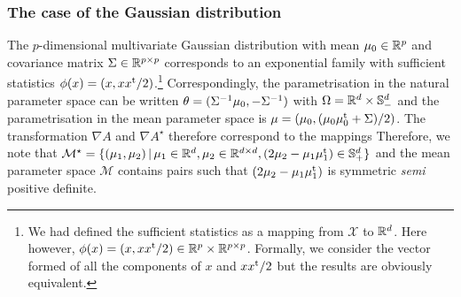 \subsubsection*{The case of the Gaussian distribution}
The $p$-dimensional multivariate Gaussian distribution with mean $\mu_0\in\mathbb R^{p}$ and covariance matrix $\Sigma\in\mathbb R^{p\times p}$ corresponds to an exponential family with sufficient statistics $\phi(x) = (x,xx^\mathrm{t}/2)$.\footnote{We had defined the sufficient statistics as a mapping from $\mathcal X$ to $\mathbb R^{d}$. Here however, $\phi(x)=(x,xx^\mathrm{t}/2)\in\mathbb R^{p}\times \mathbb R^{p\times p}$. Formally, we consider the vector formed of all the components of $x$ and $xx^\mathrm{t}/2$ but the results are obviously equivalent.} Correspondingly, the parametrisation in the natural parameter space can be written $\theta=(\Sigma^{-1} \mu_0, -\Sigma^{-1})$ with $\Omega = \mathbb R^{d}\times \mathbb S_-^{d}$ and the parametrisation in the mean parameter space is $\mu=(\mu_0,(\mu_0\mu_0^\mathrm{t}+\Sigma)/2)$. The transformation $\nabla A$ and $\nabla A^{\star}$ therefore correspond to the mappings
%
%
Therefore, we note that $\mathcal M^{\star} = \{(\mu_1,\mu_2)\,|\, \mu_1\in\mathbb R^{d}, \mu_2\in\mathbb R^{d\times d}, (2\mu_2-\mu_1\mu_1^\mathrm{t})\in\mathbb S_+^{d}\}$ and the mean parameter space $\mathcal M$ contains pairs such that $(2\mu_2-\mu_1\mu_1^\mathrm{t})$ is symmetric \emph{semi} positive definite.

